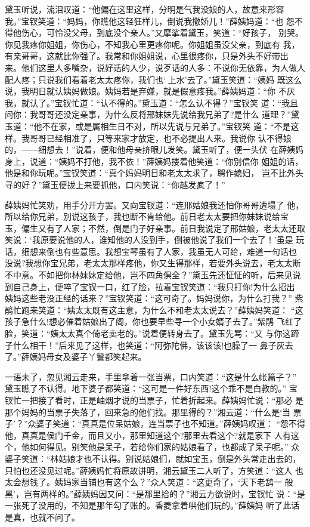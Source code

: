 黛玉听说，流泪叹道：“他偏在这里这样，分明是气我没娘的人，故意来形容
我。”宝钗笑道：“妈妈，你瞧他这轻狂样儿，倒说我撒娇儿！”薛姨妈道：“也
怨不得他伤心，可怜没父母，到底没个亲人。”又摩挲着黛玉，笑道：“好孩子，
别哭。你见我疼你姐姐，你伤心，不知我心里更疼你呢。你姐姐虽没父亲，到底有
我，有亲哥哥，这就比你强了。我常和你姐姐说，心里很疼你，只是外头不好带出
来。他们这里人多嘴杂，说好话的人少，说歹话的人多：不说你无依靠，为人做人
配人疼；只说我们看着老太太疼你，我们也‘上水’去了。”黛玉笑道：“姨妈
既这么说，我明日就认姨妈做娘。姨妈若是弃嫌，就是假意疼我。”薛姨妈道：“你
不厌我，就认了。”宝钗忙道：“认不得的。”黛玉道：“怎么认不得？”宝钗笑
道：“我且问你：我哥哥还没定亲事，为什么反将邢妹妹先说给我兄弟了?是什么
道理？”黛玉道：“他不在家，或是属相生日不对，所以先说与兄弟了。”宝钗笑
道：“不是这样。我哥哥已经相准了，只等来家才放定，也不必提出人来。我说你
认不得娘的，——细想去！”说着，便和他母亲挤眼儿发笑。黛玉听了，便一头伏
在薛姨妈身上，说道：“姨妈不打他，我不依！”薛姨妈搂着他笑道：“你别信你
姐姐的话，他是和你玩呢。”宝钗笑道：“真个妈妈明日和老太太求了，聘作媳妇，
岂不比外头寻的好？”黛玉便拢上来要抓他，口内笑说：“你越发疯了！”

薛姨妈忙笑劝，用手分开方罢。又向宝钗道：“连邢姑娘我还怕你哥哥遭塌了
他，所以给你兄弟，别说这孩子，我也断不肯给他。前日老太太要把你妹妹说给宝
玉，偏生又有了人家；不然，倒是门子好亲事。前日我说定了邢姑娘，老太太还取
笑说：‘我原要说他的人，谁知他的人没到手，倒被他说了我们一个去了！’虽是
玩话，细想来倒也有些意思。我想宝琴虽有了人家，我虽无人可给，难道一句话也
没说?我想你宝兄弟，老太太那样疼他，你又生得那样，若要外头说去，老太太断
不中意。不如把你林妹妹定给他，岂不四角俱全？”黛玉先还怔怔的听，后来见说
到自己身上，便啐了宝钗一口，红了脸，拉着宝钗笑道：“我只打你!为什么招出
姨妈这些老没正经的话来？”宝钗笑道：“这可奇了。妈妈说你，为什么打我？”
紫鹃忙跑来笑道：“姨太太既有这主意，为什么不和老太太说去？”薛姨妈笑道：
“这孩子急什么!想必催着姑娘出了阁，你也要早些寻一个小女婿子去了。”紫鹃
飞红了脸，笑道：“姨太太真个倚老卖老的。”说着便转身去了。黛玉先骂：“又
与你这蹄子什么相干！”后来见了这样，也笑道：“阿弥陀佛，该该该!也臊了一
鼻子灰去了。”薛姨妈母女及婆子丫鬟都笑起来。

一语未了，忽见湘云走来，手里拿着一张当票，口内笑道：“这是什么帐篇子？”
黛玉瞧了不认得。地下婆子都笑道：“这可是一件好东西!这个乖不是白教的。”
宝钗忙一把接了看时，正是岫烟才说的当票子，忙着折起来。薛姨妈忙说：“那必
是那个妈妈的当票子失落了，回来急的他们找。那里得的？”湘云道：“什么是‘当
票子’？”众婆子笑道：“真真是位呆姑娘，连当票子也不知道。”薛姨妈叹道：
“怨不得他，真真是侯门千金，而且又小，那里知道这个?那里去看这个?就是家下
人有这个，他如何得见。别笑他是呆子，若给你们家的姑娘看了，也都成了呆子呢。”
众婆子笑道：“林姑娘才也不认得。别说姑娘们，就如宝玉，倒是外头常走出去的，
只怕也还没见过呢。”薛姨妈忙将原故讲明，湘云黛玉二人听了，方笑道：“这人
也太会想钱了。姨妈家当铺也有这个么？”众人笑道：“这更奇了，‘天下老鸹一
般黑’，岂有两样的。”薛姨妈因又问：“是那里拾的？”湘云方欲说时，宝钗忙
说：“是一张死了没用的，不知是那年勾了账的。香菱拿着哄他们玩的。”薛姨妈
听了此话是真，也就不问了。

